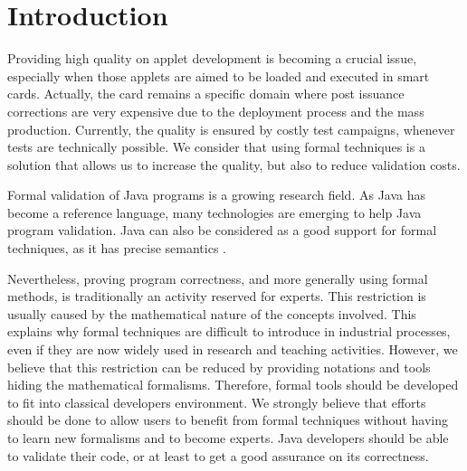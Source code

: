 \chapter{Introduction}
Providing high quality on applet development is becoming a crucial
issue, especially when those applets are aimed to be loaded and executed in smart cards.  Actually, the card
remains a specific domain where post issuance corrections are very expensive due to the deployment process and
the mass production. Currently, the quality is ensured by costly test campaigns, whenever tests are technically
possible. We consider that using formal techniques is a solution that allows us to increase the quality, but
also to reduce validation costs.

 Formal validation of Java programs is a growing research
 field.  As Java has become a reference language, many technologies are
 emerging to help Java program validation.  Java can also be
 considered as a good support for formal techniques, as it has precise semantics \cite{Gosl00a}.

 Nevertheless, proving program correctness, and more generally using
formal methods, is traditionally an activity reserved for experts.  This restriction is usually caused by the
mathematical nature of the concepts involved.  This explains why formal techniques are difficult to introduce in
industrial processes, even if they are now widely used in research and teaching activities.  However, we believe
that this restriction can be reduced by providing notations and tools hiding the mathematical formalisms.
Therefore, formal tools should be developed to fit into classical developers environment.  We strongly believe
that efforts should be done to allow users to benefit from formal techniques without having to learn new
formalisms and to become experts. Java developers should be able to validate their code, or at least to get a
good assurance on its correctness.

